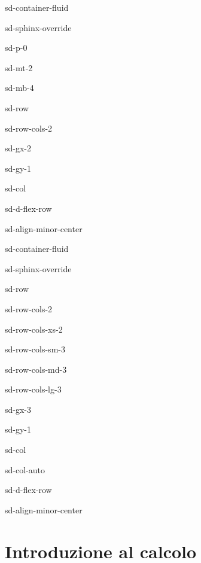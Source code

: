 \documentclass[letterpaper,10pt,english]{jupyterBook}
\begin{document}
\begin{sphinxuseclass}{sd-container-fluid}
\begin{sphinxuseclass}{sd-sphinx-override}
\begin{sphinxuseclass}{sd-p-0}
\begin{sphinxuseclass}{sd-mt-2}
\begin{sphinxuseclass}{sd-mb-4}
\begin{sphinxuseclass}{sd-row}
\begin{sphinxuseclass}{sd-row-cols-2}
\begin{sphinxuseclass}{sd-gx-2}
\begin{sphinxuseclass}{sd-gy-1}
\begin{sphinxuseclass}{sd-col}
\begin{sphinxuseclass}{sd-d-flex-row}
\begin{sphinxuseclass}{sd-align-minor-center}
\begin{sphinxuseclass}{sd-container-fluid}
\begin{sphinxuseclass}{sd-sphinx-override}
\begin{sphinxuseclass}{sd-row}
\begin{sphinxuseclass}{sd-row-cols-2}
\begin{sphinxuseclass}{sd-row-cols-xs-2}
\begin{sphinxuseclass}{sd-row-cols-sm-3}
\begin{sphinxuseclass}{sd-row-cols-md-3}
\begin{sphinxuseclass}{sd-row-cols-lg-3}
\begin{sphinxuseclass}{sd-gx-3}
\begin{sphinxuseclass}{sd-gy-1}
\begin{sphinxuseclass}{sd-col}
\begin{sphinxuseclass}{sd-col-auto}
\begin{sphinxuseclass}{sd-d-flex-row}
\begin{sphinxuseclass}{sd-align-minor-center}
\end{sphinxuseclass}
\end{sphinxuseclass}
\end{sphinxuseclass}
\end{sphinxuseclass}
\end{sphinxuseclass}
\end{sphinxuseclass}
\end{sphinxuseclass}
\end{sphinxuseclass}
\end{sphinxuseclass}
\end{sphinxuseclass}
\end{sphinxuseclass}
\end{sphinxuseclass}
\end{sphinxuseclass}
\end{sphinxuseclass}
\end{sphinxuseclass}
\end{sphinxuseclass}
\end{sphinxuseclass}
\end{sphinxuseclass}
\end{sphinxuseclass}
\end{sphinxuseclass}
\end{sphinxuseclass}
\end{sphinxuseclass}
\end{sphinxuseclass}
\end{sphinxuseclass}
\end{sphinxuseclass}
\end{sphinxuseclass}

\chapter{Introduzione al calcolo}
\label{\detokenize{ch/calculus:introduzione-al-calcolo}}\label{\detokenize{ch/calculus:math-hs-calculus}}\label{\detokenize{ch/calculus::doc}}
\sphinxstepscope
\end{document}
